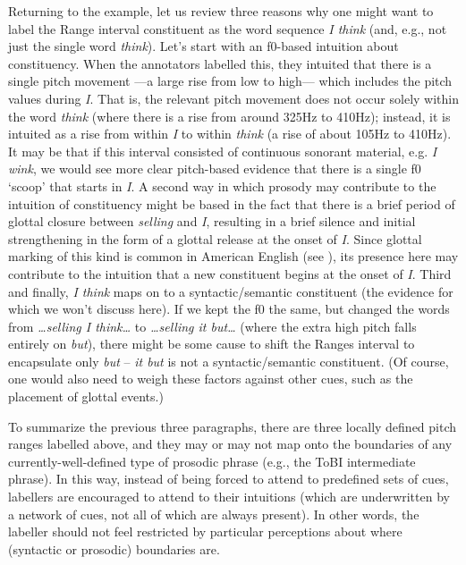 \documentclass[11pt, twoside]{memoir}
\def\langtext#1{\textit{#1}}
\def\langtextquot#1{\langtext{#1}}
\begin{document}
Returning to the example, let us review three reasons why one might want to label the Range interval constituent as the word sequence \langtext{I think} (and, e.g., not just the single word \langtext{think}). Let’s start with an f0-based intuition about constituency. When the annotators labelled this, they intuited that there is a single pitch movement —a large rise from low to high— which includes the pitch values during \langtext{I}. That is, the relevant pitch movement does not occur solely within the word \langtext{think} (where there is a rise from around 325Hz to 410Hz); instead, it is intuited as a rise from within \langtext{I} to within \langtext{think} (a rise of about 105Hz to 410Hz). It may be that if this interval consisted of continuous sonorant material, e.g. \langtextquot{I wink}, we would see more clear pitch-based evidence that there is a single f0 ‘scoop’ that starts in \langtext{I}. A second way in which prosody may contribute to the intuition of constituency might be based in the fact that there is a brief period of glottal closure between \langtext{selling} and \langtext{I}, resulting in a brief silence and initial strengthening in the form of a glottal release at the onset of \langtext{I}. Since glottal marking of this kind is common in American English (see \citealt{dilley-96}), its presence here may contribute to the intuition that a new constituent begins at the onset of \langtext{I}. Third and finally, \langtextquot{I think} maps on to a syntactic\slash semantic constituent (the evidence for which we won’t discuss here). If we kept the f0 the same, but changed the words from \langtextquot{…selling I think…} to \langtextquot{…selling it but…} (where the extra high pitch falls entirely on \langtext{but}), there might be some cause to shift the Ranges interval to encapsulate only \langtext{but} – \langtextquot{it but} is not a syntactic\slash semantic constituent. (Of course, one would also need to weigh these factors against other cues, such as the placement of glottal events.)

To summarize the previous three paragraphs, there are three locally defined pitch ranges labelled above, and they may or may not map onto the boundaries of any currently-well-defined type of prosodic phrase (e.g., the ToBI intermediate phrase). In this way, instead of being forced to attend to predefined sets of cues, labellers are encouraged to attend to their intuitions (which are underwritten by a network of cues, not all of which are always present). In other words, the labeller should not feel restricted by particular perceptions about where (syntactic or prosodic) boundaries are.
\end{document}
